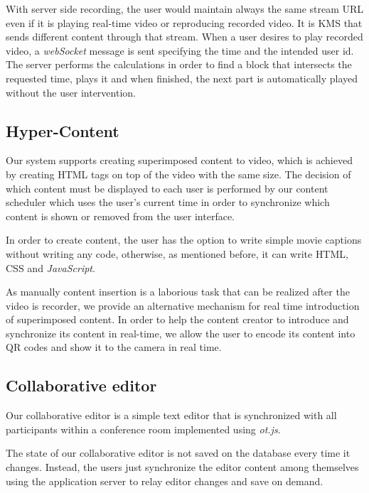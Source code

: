 \documentclass[conference,compsoc,a4paper]{IEEEtran}
\begin{document}
	With server side recording, the user would maintain always the same stream \gls{URL} even if it is playing real-time video or reproducing recorded video. It is \gls{KMS} that sends different content through that stream. When a user desires to play recorded video, a \emph{webSocket} message is sent specifying the time and the intended user id. The server performs the calculations in order to find a block that intersects the requested time, plays it and when finished, the next part is automatically played without the user intervention.



\subsection{Hyper-Content}

	Our system supports creating superimposed content to video, which is achieved by creating \gls{HTML} tags on top of the video  with the same size. The decision of which content must be displayed to each user is performed by our content scheduler which uses the user's current time in order to synchronize which content is shown or removed from the user interface.

	In order to create content, the user has the option to write simple movie captions without writing any code, otherwise, as mentioned before, it can write \gls{HTML}, \gls{CSS} and \emph{JavaScript}.

	As manually content insertion is a laborious task that can be realized after the video is recorder, we provide an alternative mechanism for real time introduction of superimposed content.	In order to help the content creator to introduce and synchronize its content in real-time, we allow the user to encode its content into \gls{QR} codes and show it to the camera in real time.


\subsection{Collaborative editor}

Our collaborative editor is a simple text editor that is synchronized with all participants within a conference room implemented using \emph{ot.js}.

The state of our collaborative editor is not saved on the database every time it changes. Instead, the users just synchronize the editor content among themselves using the application server to relay editor changes and save on demand.
\end{document}
